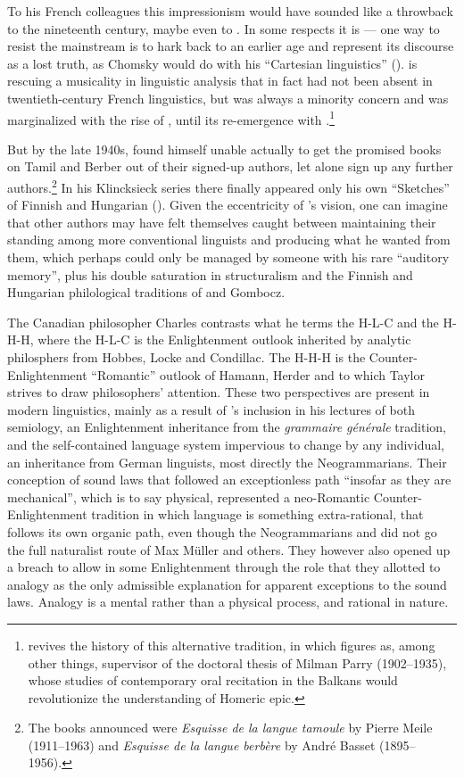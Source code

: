 \documentclass[output=paper]{langscibook}
\begin{document}
To his French colleagues this impressionism would have sounded like a throwback to the nineteenth century, maybe even to \citet{Rousseau1782175561}. In some respects it is — one way to resist the mainstream is to hark back to an earlier age and represent its discourse as a lost truth, as Chomsky would do with his ``Cartesian linguistics'' (\citeyear{Chomsky20091966}). {\Sauvageot} is rescuing a musicality in linguistic analysis that in fact had not been absent in twentieth-century French linguistics, but was always a minority concern and was marginalized with the rise of , until its re-emergence with {\Meschonnic}.\footnote{\citet{Saussy2016} revives the history of this alternative tradition, in which {\Meillet} figures as, among other things, supervisor of the doctoral thesis of Milman Parry (1902--1935), whose studies of contemporary oral recitation in the Balkans would revolutionize the understanding of Homeric epic.}

But by the late 1940s, {\Sauvageot} found himself unable actually to get the prom\-ised books on Tamil and Berber out of their signed-up authors, let alone sign up any further authors.\footnote{The books announced were \emph{Esquisse de la langue tamoule} by Pierre Meile (1911--1963) and \emph{Esquisse de la langue berbère} by André Basset (1895--1956).} In his Klincksieck series there finally appeared only his own ``Sketches'' of Finnish and Hungarian (\citeyear{Sauvageot1951}). Given the eccentricity of {\Sauvageot}'s vision, one can imagine that other authors may have felt themselves caught between maintaining their standing among more conventional linguists and producing what he wanted from them, which perhaps could only be managed by someone with his rare ``auditory memory'', plus his double saturation in structuralism and the Finnish and Hungarian philological traditions of {} and Gombocz.

\largerpage
The Canadian philosopher Charles \citet{Taylor2016} contrasts what he terms the H-L-C and the H-H-H, where the H-L-C is the Enlightenment outlook inherited by analytic philosphers from Hobbes, Locke and Condillac. The H-H-H is the Counter-Enlightenment ``Romantic'' outlook of Hamann, Herder and {\Humboldt} to which Taylor strives to draw philosophers' attention. These two perspectives are present in modern linguistics, mainly as a result of {\Saussure}'s inclusion in his lectures of both semiology, an Enlightenment inheritance from the \emph{grammaire générale} tradition, and the self-contained language system impervious to change by any individual, an inheritance from German linguists, most directly the Neogrammarians. Their conception of sound laws that followed an exceptionless path ``insofar as they are mechanical'', which is to say physical, represented a neo-Romantic Counter-Enlightenment tradition in which language is something extra-rational, that follows its own organic path, even though the Neogrammarians and {\Saussure} did not go the full naturalist route of Max Müller and others. They however also opened up a breach to allow in some Enlightenment through the role that they allotted to analogy as the only admissible explanation for apparent exceptions to the sound laws. Analogy is a mental rather than a physical process, and rational in nature.
\end{document}
